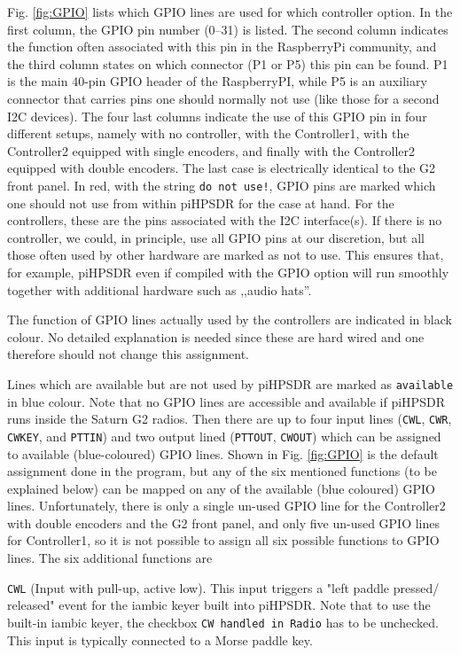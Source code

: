 \documentclass[12pt]{book}
\def\rett#1{\texttt{\color{red}#1}}
\def\bltt#1{\texttt{\color{blue}#1}}
\def\pH{pi\-HPSDR\xspace}
\begin{document}
Fig. \ref{fig:GPIO} lists which GPIO lines are used for which controller option. In the first column,
the GPIO pin number (0--31) is listed. The second column indicates the function often
associated with this pin in the RaspberryPi community, and the third column states on which connector
(P1 or P5) this pin can be found. P1 is the main 40-pin GPIO header of the RaspberryPI, while P5 is
an auxiliary connector that carries pins one should normally not use (like those for a second I2C
devices). The four last columns indicate the use of this GPIO pin in four different setups, namely
with no controller, with the Controller1, with the Controller2 equipped with single encoders, and
finally with the Controller2 equipped with double encoders. The last case is electrically identical to
the G2 front panel. In red, with the string \texttt{do not use!}, GPIO pins are marked which one should
not use from within \pH for the case at hand. For the controllers, these are the pins associated
with the I2C interface(s). If there is no controller, we could, in principle, use all GPIO pins at our
discretion, but all those often used by other hardware are marked as not to use. This ensures that,
for example, \pH even if compiled with the GPIO option will run smoothly together with additional
hardware such as ,,audio hats''.

The function of GPIO lines actually used by the controllers are indicated in black colour. No detailed
explanation is needed since these are hard wired and one therefore should not change this assignment.

Lines which are available but are not used by \pH are marked as \texttt{available} in blue colour.
{\color{red} Note that no GPIO lines are accessible and available if \pH runs inside the Saturn G2 radios.}
Then there are up to four input lines (\texttt{CWL}, \texttt{CWR}, \texttt{CWKEY}, and \texttt{PTTIN})
and two output lined (\texttt{PTTOUT}, \texttt{CWOUT}) which can be assigned to available (blue-coloured)
GPIO lines. Shown in Fig. \ref{fig:GPIO} is the default assignment done in the program, but any of the
six mentioned functions (to be explained below) can be mapped on any of the available (blue coloured)
GPIO lines. Unfortunately, there is only a single un-used GPIO line for the Controller2 with double
encoders and the G2 front panel, and only five un-used GPIO lines for Controller1, so it is not possible
to assign all six possible functions to GPIO lines. The six additional functions are

\rett{CWL} (Input with pull-up, active low). This input triggers a "left paddle pressed/
released" event for the
iambic keyer built into \pH. Note that to use the built-in iambic keyer, the checkbox
\bltt{CW handled in Radio} has to be unchecked. This input is typically connected to
a Morse paddle key.
\end{document}
